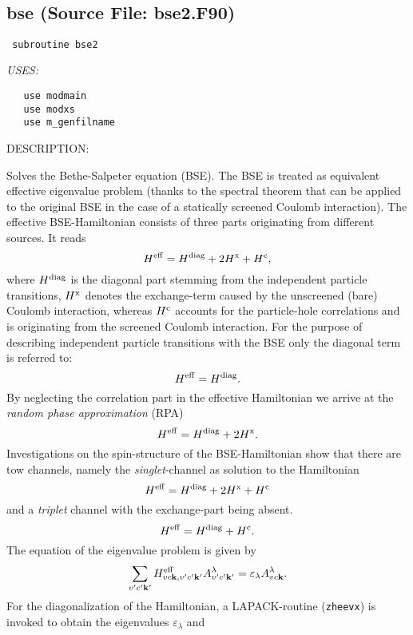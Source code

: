 \documentclass[11pt]{article}
\begin{document}
 
 
\mbox{}\hrulefill\ 
 
\subsection{bse (Source File: bse2.F90)}


\begin{verbatim} subroutine bse2\end{verbatim}{\em USES:}
\begin{verbatim}   use modmain
   use modxs
   use m_genfilname\end{verbatim}
{\sf DESCRIPTION:\\ }


     Solves the Bethe-Salpeter equation (BSE). The BSE is treated as equivalent
     effective eigenvalue problem (thanks to the spectral theorem that can
     be applied to the original BSE in the case of a statically screened Coulomb
     interaction). The effective BSE-Hamiltonian consists of three parts
     originating from different sources. It reads
     $$ H^{\rm eff} = H^{\rm diag} + 2H^{\rm x} + H^{\rm c}, $$
     where $H^{\rm diag}$ is the diagonal part stemming from the independent
     particle transitions, $H^{\rm x}$ denotes the exchange-term caused by the
     unscreened (bare) Coulomb interaction, whereas $H^{\rm c}$ accounts for the
     particle-hole correlations and is originating from the screened Coulomb
     interaction.
     For the purpose of describing independent particle transitions with the
     BSE only the diagonal term is referred to:
     $$ H^{\rm eff} = H^{\rm diag}. $$
     By neglecting the correlation part in the effective Hamiltonian we arrive
     at the {\it random phase approximation} (RPA)
     $$ H^{\rm eff} = H^{\rm diag} + 2H^{\rm x}. $$
     Investigations on the spin-structure of the BSE-Hamiltonian show that there
     are tow channels, namely the {\it singlet}-channel as solution to the
     Hamiltonian
     $$  H^{\rm eff} = H^{\rm diag} + 2H^{\rm x} + H^{\rm c} $$
     and a {\it triplet} channel with the exchange-part being absent.
     $$ H^{\rm eff} = H^{\rm diag} + H^{\rm c}. $$
     The equation of the eigenvalue problem is given by
     $$ \sum_{v'c'{\bf k'}} H^{\rm eff}_{vc{\bf k},v'c'{\bf k'}}
         A^{\lambda}_{v'c'{\bf k'}}
         =  \varepsilon_{\lambda} A^{\lambda}_{vc{\bf k}}. $$
     For the diagonalization of the Hamiltonian, a LAPACK-routine ({\tt zheevx})
     is invoked to obtain the eigenvalues $\varepsilon_{\lambda}$ and
\end{document}

